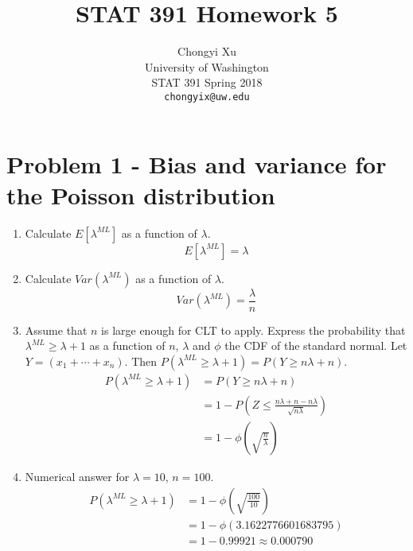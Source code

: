 \documentclass[preprint,12pt]{elsarticle}
\begin{document}
    \title{\LARGE \bf
        STAT 391 Homework 5
        }
        
        \author{ \parbox{3 in}{\centering Chongyi Xu \\
                 University of Washington\\
                 STAT 391 Spring 2018\\
                 {\tt\small chongyix@uw.edu}}
        }
    \maketitle

    \section{Problem 1 - Bias and variance for the Poisson distribution}
    \begin{enumerate}[label=\alph*]
        \item Calculate $E[\lambda^{ML}]$ as a function of $\lambda$.
        \begin{equation*}
            E[\lambda^{ML}] = \lambda
        \end{equation*}

        \item Calculate $Var(\lambda^{ML})$ as a function of $\lambda$.
        \begin{equation*}
            Var(\lambda^{ML}) = \frac{\lambda}{n}            
        \end{equation*}

        \item Assume that $n$ is large enough for CLT to apply. Express
        the probability that $\lambda^{ML}\geq \lambda+1$ as a function
        of $n$, $\lambda$ and $\phi$ the CDF of the standard normal. Let
        $Y=(x_1+\cdots +x_n)$. Then $P(\lambda^{ML}\geq \lambda+1) 
        = P(Y\geq n\lambda+n)$.
        \begin{align*}
            P(\lambda^{ML}\geq \lambda+1) &= P(Y\geq n\lambda+n)\\
            &= 1 - P(Z\leq \frac{n\lambda+n-n\lambda}{\sqrt{n\lambda}})\\
            &= 1 - \phi(\sqrt{\frac{n}{\lambda}})
        \end{align*}
        
        \item Numerical answer for $\lambda=10$, $n=100$.
        \begin{align*}
            P(\lambda^{ML}\geq \lambda+1) &= 1- \phi(\sqrt{\frac{100}{10}})\\
            &= 1 - \phi(3.1622776601683795)\\
            &= 1 - 0.99921 \approx 0.000790
        \end{align*}
    \end{enumerate}
\end{document}
